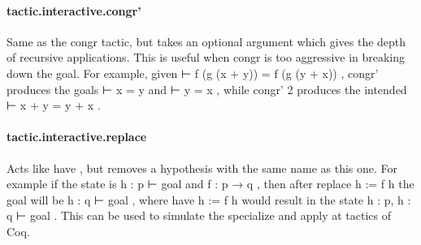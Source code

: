 \documentclass{article}
\begin{document}
\paragraph{tactic.interactive.congr'}
\par
Same as the 
\colorbox[RGB]{253,246,227}{{{{\color[RGB]{101, 123, 131} congr }}}} tactic, but takes an optional argument which gives
the depth of recursive applications. This is useful when 
\colorbox[RGB]{253,246,227}{{{{\color[RGB]{101, 123, 131} congr }}}}is too aggressive in breaking down the goal. For example, given
\colorbox[RGB]{253,246,227}{{{{\color[RGB]{101, 123, 131} ⊢ f (g (x  }}}{{{\color[RGB]{181, 137, 0} + }}}{{{\color[RGB]{101, 123, 131}  y))  }}}{{{\color[RGB]{181, 137, 0} = }}}{{{\color[RGB]{101, 123, 131}  f (g (y  }}}{{{\color[RGB]{181, 137, 0} + }}}{{{\color[RGB]{101, 123, 131}  x)) }}}}, 
\colorbox[RGB]{253,246,227}{{{{\color[RGB]{101, 123, 131} congr' }}}} produces the goals 
\colorbox[RGB]{253,246,227}{{{{\color[RGB]{101, 123, 131} ⊢ x  }}}{{{\color[RGB]{181, 137, 0} = }}}{{{\color[RGB]{101, 123, 131}  y }}}}and 
\colorbox[RGB]{253,246,227}{{{{\color[RGB]{101, 123, 131} ⊢ y  }}}{{{\color[RGB]{181, 137, 0} = }}}{{{\color[RGB]{101, 123, 131}  x }}}}, while 
\colorbox[RGB]{253,246,227}{{{{\color[RGB]{101, 123, 131} congr'  }}}{{{\color[RGB]{108, 113, 196} 2 }}}} produces the intended 
\colorbox[RGB]{253,246,227}{{{{\color[RGB]{101, 123, 131} ⊢ x  }}}{{{\color[RGB]{181, 137, 0} + }}}{{{\color[RGB]{101, 123, 131}  y  }}}{{{\color[RGB]{181, 137, 0} = }}}{{{\color[RGB]{101, 123, 131}  y  }}}{{{\color[RGB]{181, 137, 0} + }}}{{{\color[RGB]{101, 123, 131}  x }}}}.
\paragraph{tactic.interactive.replace}
\par
Acts like 
\colorbox[RGB]{253,246,227}{{{{\color[RGB]{133, 153, 0} have }}}}, but removes a hypothesis with the same name as
this one. For example if the state is 
\colorbox[RGB]{253,246,227}{{{{\color[RGB]{101, 123, 131} h : p ⊢ goal }}}} and 
\colorbox[RGB]{253,246,227}{{{{\color[RGB]{101, 123, 131} f : p  }}}{{{\color[RGB]{133, 153, 0} → }}}{{{\color[RGB]{101, 123, 131}  q }}}},
then after 
\colorbox[RGB]{253,246,227}{{{{\color[RGB]{101, 123, 131} replace h  }}}{{{\color[RGB]{181, 137, 0} := }}}{{{\color[RGB]{101, 123, 131}  f h }}}} the goal will be 
\colorbox[RGB]{253,246,227}{{{{\color[RGB]{101, 123, 131} h : q ⊢ goal }}}},
where 
\colorbox[RGB]{253,246,227}{{{{\color[RGB]{133, 153, 0} have }}}{{{\color[RGB]{101, 123, 131}  h  }}}{{{\color[RGB]{181, 137, 0} := }}}{{{\color[RGB]{101, 123, 131}  f h }}}} would result in the state 
\colorbox[RGB]{253,246,227}{{{{\color[RGB]{101, 123, 131} h : p, h : q ⊢ goal }}}}.
This can be used to simulate the 
\colorbox[RGB]{253,246,227}{{{{\color[RGB]{101, 123, 131} specialize }}}} and 
\colorbox[RGB]{253,246,227}{{{{\color[RGB]{101, 123, 131} apply  }}}{{{\color[RGB]{133, 153, 0} at }}}} tactics
of Coq.
\end{document}
